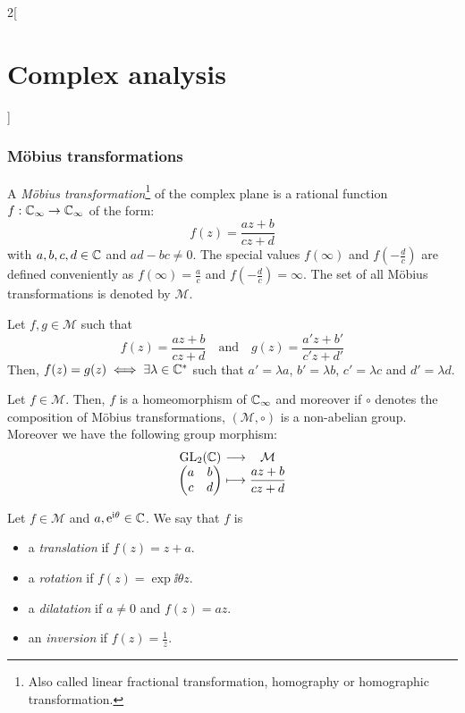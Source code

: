 \documentclass[../../../main.tex]{subfiles}
\begin{document}
\begin{multicols}{2}[\section{Complex analysis}]
  \subsubsection{Möbius transformations}
  \begin{definition}
    A \emph{Möbius transformation}\footnote{Also called linear fractional transformation, homography or homographic transformation.} of the complex plane is a rational function $f:\mathbb{C}_\infty\rightarrow\mathbb{C}_\infty$ of the form: $$f(z)=\frac{az+b}{cz+d}$$ with $a,b,c,d\in\mathbb{C}$ and $ad-bc\ne 0$. The special values $f(\infty)$ and $f\left(-\frac{d}{c}\right)$ are defined conveniently as $f(\infty)=\frac{a}{c}$ and $f\left(-\frac{d}{c}\right)=\infty$. The set of all Möbius transformations is denoted by $\mathcal{M}$.
  \end{definition}
  \begin{proposition}
    Let $f,g\in\mathcal{M}$ such that $$f(z)=\frac{az+b}{cz+d}\quad\text{and}\quad g(z)=\frac{a'z+b'}{c'z+d'}$$
    Then, $f(z)=g(z)\iff \exists\lambda\in\mathbb{C}^*$ such that $a'=\lambda a$, $b'=\lambda b$, $c'=\lambda c$ and $d'=\lambda d$.
  \end{proposition}
  \begin{proposition}
    Let $f\in\mathcal{M}$. Then, $f$ is a homeomorphism of $\mathbb{C}_\infty$ and moreover if $\circ$ denotes the composition of Möbius transformations, $(\mathcal{M},\circ)$ is a non-abelian group. Moreover we have the following group morphism:
    $$\function{}{\GL_2(\CC)}{\mathcal{M}}{\begin{pmatrix}
          a & b \\
          c & d
        \end{pmatrix}}{\displaystyle\frac{az+b}{cz+d}}$$
  \end{proposition}
  \begin{definition}
    Let $f\in\mathcal{M}$ and $a,\mathrm{e}^{\mathrm{i}\theta}\in\mathbb{C}$. We say that $f$ is
    \begin{itemize}
      \item a \emph{translation} if $f(z)=z+a$.
      \item a \emph{rotation} if $f(z)=\exp{\ii\theta}z$.
      \item a \emph{dilatation} if $a\ne 0$ and $f(z)=az$.
      \item an \emph{inversion} if $f(z)=\frac{1}{z}$.
    \end{itemize}
  \end{definition}
  \begin{theorem}

\end{theorem}
\end{multicols}
\end{document}
